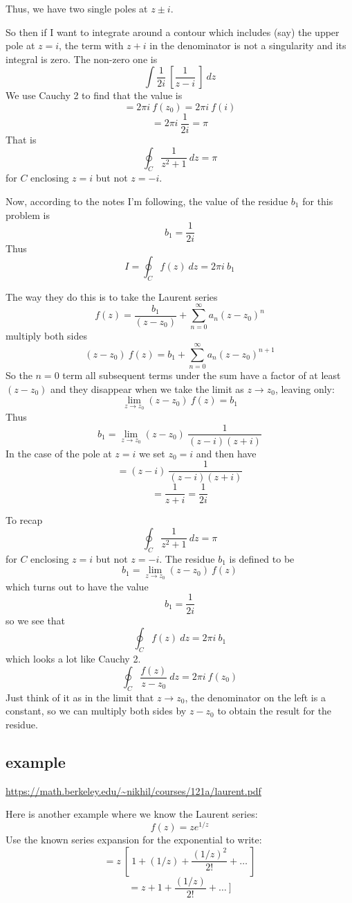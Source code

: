 \documentclass[11pt, oneside]{article}   	%
\begin{document}
Thus, we have two single poles at $z \pm i$.  

So then if I want to integrate around a contour which includes (say) the upper pole at $z = i$, the term with $z + i$ in the denominator is not a singularity and its integral is zero.  The non-zero one is
\[ \int \frac{1}{2i} \ [ \frac{1}{z - i} \ ] \ dz \]
We use Cauchy 2 to find that the value is
\[ = 2 \pi i \ f(z_0) =  2 \pi i \ f(i) \]
\[ = 2 \pi i \ \frac{1}{2i} = \pi \]
That is
\[  \oint_C \frac{1}{z^2 + 1} \ dz = \pi \]
for $C$ enclosing $z=i$ but not $z = -i$.

Now, according to the notes I'm following, the value of the residue $b_1$ for this problem is 
\[ b_1 = \frac{1}{2i} \]
Thus
\[ I = \oint_C f(z) \ dz = 2 \pi i \ b_1 \]

The way they do this is to take the Laurent series
\[ f(z) = \frac{b_1}{(z-z_0)} + \sum_{n=0}^{\infty} a_n (z-z_0)^n \]
multiply both sides
\[ (z-z_0) \ f(z) = b_1 + \sum_{n=0}^{\infty} a_n (z-z_0)^{n+1} \]
So the $n=0$ term all subsequent terms under the sum have a factor of at least $(z - z_0)$ and they disappear when we take the limit as $z \rightarrow z_0$, leaving only:
\[ \lim_{z \rightarrow z_0} (z-z_0) \ f(z) = b_1 \]
Thus
\[ b_1 = \lim_{z \rightarrow z_0} (z-z_0) \ \frac{1}{(z - i)(z + i)} \]
In the case of the pole at $z = i$ we set $z_0 = i$ and then have
\[ = (z-i) \ \frac{1}{(z - i)(z + i)} \]
\[ = \frac{1}{z + i} = \frac{1}{2i} \]

To recap
\[  \oint_C \frac{1}{z^2 + 1} \ dz = \pi \]
for $C$ enclosing $z=i$ but not $z = -i$.
The residue $b_1$ is defined to be
\[ b_1 = \lim_{z \rightarrow z_0} (z-z_0) \ f(z)  \]
which turns out to have the value
\[ b_1 = \frac{1}{2i} \]
so we see that 
\[ \oint_C f(z) \ dz = 2 \pi i \ b_1 \]
which looks a lot like Cauchy 2.
\[ \oint_C \frac{f(z)}{z - z_0} \ dz = 2 \pi i \ f(z_0) \]
Just think of it as in the limit that $z \rightarrow z_0$, the denominator on the left is a constant, so we can multiply both sides by $z - z_0$ to obtain the result for the residue.

\subsection*{example}
\url{https://math.berkeley.edu/~nikhil/courses/121a/laurent.pdf}

Here is another example where we know the Laurent series:
\[ f(z) = z e^{1/z} \]
Use the known series expansion for the exponential to write:
\[ = z \ [ \ 1 + (1/z) + \frac{(1/z)^2}{2!} + \dots \ ] \]
\[ = z + 1 + \frac{(1/z)}{2!} + \dots \ ] \]
\end{document}
